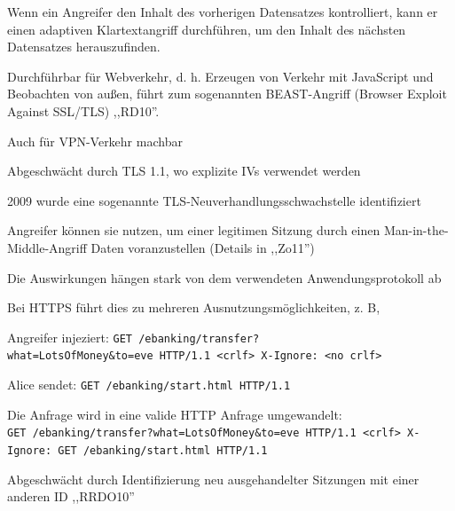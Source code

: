 \documentclass[a4paper]{article}
\begin{document}
\begin{multicols}{3}
\begin{itemize*}
\begin{itemize*}
\begin{itemize*}
                        \item Wenn ein Angreifer den Inhalt des vorherigen Datensatzes kontrolliert, kann er einen adaptiven Klartextangriff durchführen, um den Inhalt des nächsten Datensatzes herauszufinden.
                        \item Durchführbar für Webverkehr, d. h. Erzeugen von Verkehr mit JavaScript und Beobachten von außen, führt zum sogenannten BEAST-Angriff (Browser Exploit Against SSL/TLS) ,,RD10''.
                        \item Auch für VPN-Verkehr machbar
                        \item Abgeschwächt durch TLS 1.1, wo explizite IVs verwendet werden
                        \item 2009 wurde eine sogenannte TLS-Neuverhandlungsschwachstelle identifiziert
                        \begin{itemize*} \item Angreifer können sie nutzen, um einer legitimen Sitzung durch einen Man-in-the-Middle-Angriff Daten voranzustellen (Details in ,,Zo11'') \item Die Auswirkungen hängen stark von dem verwendeten Anwendungsprotokoll ab \end{itemize*}
                        \item Bei HTTPS führt dies zu mehreren Ausnutzungsmöglichkeiten, z. B,
                        \begin{itemize*}
                              \item Angreifer injeziert: \texttt{GET\ /ebanking/transfer?what=LotsOfMoney\&to=eve\ HTTP/1.1\ <crlf>{}\ X-Ignore:\ <no\ crlf>{}}
                              \item Alice sendet: \texttt{GET\ /ebanking/start.html\ HTTP/1.1}
                              \item Die Anfrage wird in eine valide HTTP Anfrage umgewandelt: \texttt{GET\ /ebanking/transfer?what=LotsOfMoney\&to=eve\ HTTP/1.1\ <crlf>{}\ X-Ignore:\ GET\ /ebanking/start.html\ HTTP/1.1} \end{itemize*}
                        \item Abgeschwächt durch Identifizierung neu ausgehandelter Sitzungen mit einer anderen ID ,,RRDO10''
                  \end{itemize*}
            \end{itemize*}


\end{itemize*}
\end{multicols}
\end{document}
